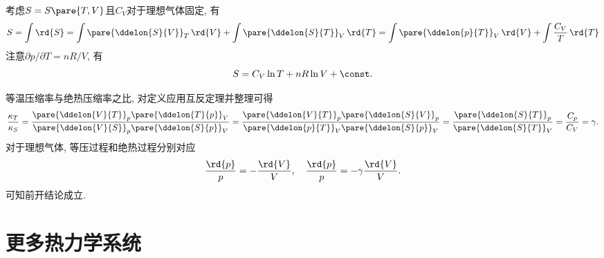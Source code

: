\documentclass[../Thermal.tex]{subfiles}
\begin{document}
\begin{ex}[理想气体的熵]
\label{ex:entropyofidealgases}
考虑$S=S\pare{T,V}$且$C_V$对于理想气体固定, 有
\[ S = \int \rd{S} = \int \pare{\ddelon{S}{V}}_T\,\rd{V} + \int \pare{\ddelon{S}{T}}_V\,\rd{T} = \int \pare{\ddelon{p}{T}}_V\,\rd{V} + \int\frac{C_V}{T}\,\rd{T} \]
注意$\partial p/\partial T = nR/V$, 有
\begin{equation}
\label{eq:entropyofidealgases}
S = C_V \ln T + nR\ln V + \const.
\end{equation}
\end{ex}
\begin{ex}
等温压缩率与绝热压缩率之比, 对定义应用互反定理并整理可得
\[ \frac{\kappa_T}{\kappa_S} = \frac{\pare{\ddelon{V}{T}}_p\pare{\ddelon{T}{p}}_V}{\pare{\ddelon{V}{S}}_p\pare{\ddelon{S}{p}}_V} = \frac{\pare{\ddelon{V}{T}}_p\pare{\ddelon{S}{V}}_p}{\pare{\ddelon{p}{T}}_V\pare{\ddelon{S}{p}}_V} = \frac{\pare{\ddelon{S}{T}}_p}{\pare{\ddelon{S}{T}}_V} = \frac{C_p}{C_V} = \gamma. \]
对于理想气体, 等压过程和绝热过程分别对应
\[ \frac{\rd{p}}{p} = -\frac{\rd{V}}{V},\quad \frac{\rd{p}}{p} = -\gamma \frac{\rd{V}}{V}. \]
可知前开结论成立.
\end{ex}
\section{更多热力学系统}
\end{document}
